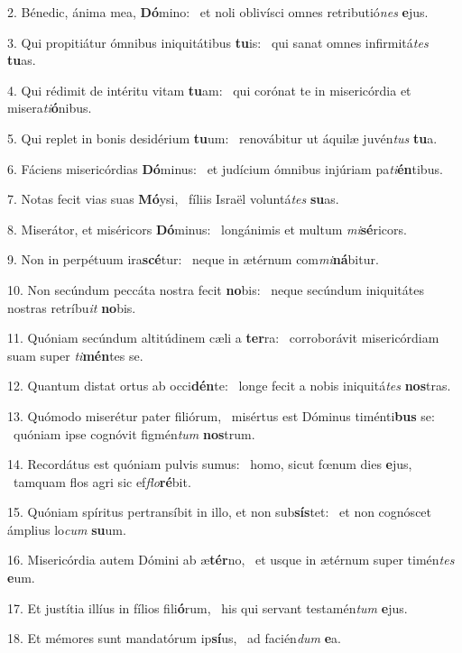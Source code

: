 2. Bénedic, ánima mea, \textbf{Dó}mino: \ast\  et noli oblivísci omnes retributió\textit{nes} \textbf{e}jus.\

3. Qui propitiátur ómnibus iniquitátibus \textbf{tu}is: \ast\  qui sanat omnes infirmitá\textit{tes} \textbf{tu}as.\

4. Qui rédimit de intéritu vitam \textbf{tu}am: \ast\  qui corónat te in misericórdia et misera\textit{ti}\textbf{ó}nibus.\

5. Qui replet in bonis desidérium \textbf{tu}um: \ast\  renovábitur ut áquilæ juvén\textit{tus} \textbf{tu}a.\

6. Fáciens misericórdias \textbf{Dó}minus: \ast\  et judícium ómnibus injúriam pa\textit{ti}\textbf{én}tibus.\

7. Notas fecit vias suas \textbf{Mó}ysi, \ast\  fíliis Israël voluntá\textit{tes} \textbf{su}as.\

8. Miserátor, et miséricors \textbf{Dó}minus: \ast\  longánimis et multum \textit{mi}\textbf{sé}ricors.\

9. Non in perpétuum ira\textbf{scé}tur: \ast\  neque in ætérnum com\textit{mi}\textbf{ná}bitur.\

10. Non secúndum peccáta nostra fecit \textbf{no}bis: \ast\  neque secúndum iniquitátes nostras retríbu\textit{it} \textbf{no}bis.\

11. Quóniam secúndum altitúdinem cæli a \textbf{ter}ra: \ast\  corroborávit misericórdiam suam super \textit{ti}\textbf{mén}tes se.\

12. Quantum distat ortus ab occi\textbf{dén}te: \ast\  longe fecit a nobis iniquitá\textit{tes} \textbf{nos}tras.\

13. Quómodo miserétur pater filiórum, \dag\  misértus est Dóminus timénti\textbf{bus} se: \ast\  quóniam ipse cognóvit figmén\textit{tum} \textbf{nos}trum.\

14. Recordátus est quóniam pulvis sumus: \dag\  homo, sicut fœnum dies \textbf{e}jus, \ast\  tamquam flos agri sic ef\textit{flo}\textbf{ré}bit.\

15. Quóniam spíritus pertransíbit in illo, et non sub\textbf{sís}tet: \ast\  et non cognóscet ámplius lo\textit{cum} \textbf{su}um.\

16. Misericórdia autem Dómini ab æ\textbf{tér}no, \ast\  et usque in ætérnum super timén\textit{tes} \textbf{e}um.\

17. Et justítia illíus in fílios fili\textbf{ó}rum, \ast\  his qui servant testamén\textit{tum} \textbf{e}jus.\

18. Et mémores sunt mandatórum ip\textbf{sí}us, \ast\  ad facién\textit{dum} \textbf{e}a.\

